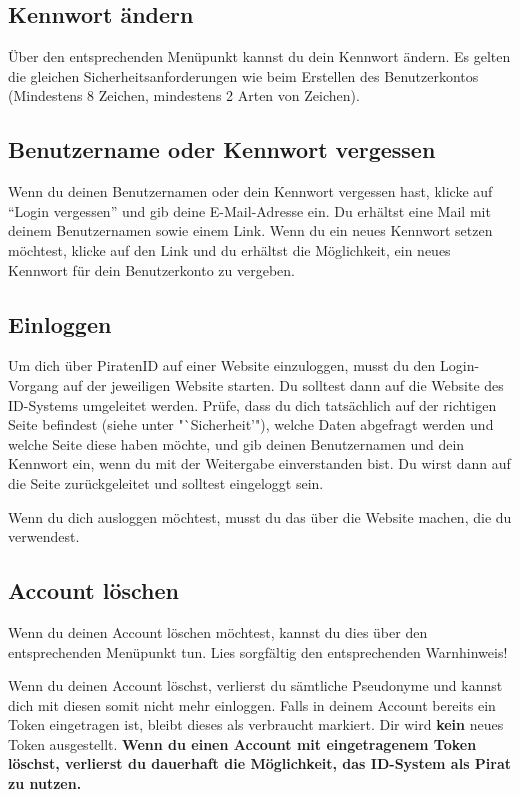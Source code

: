 \documentclass[parskip=half]{scrartcl}
\begin{document}
\subsection{Kennwort ändern}
Über den entsprechenden Menüpunkt kannst du dein Kennwort ändern.
Es gelten die gleichen Sicherheitsanforderungen wie beim Erstellen des Benutzerkontos (Mindestens 8 Zeichen, mindestens 2 Arten von Zeichen).

\subsection{Benutzername oder Kennwort vergessen}
Wenn du deinen Benutzernamen oder dein Kennwort vergessen hast, klicke auf "`Login vergessen"' und gib deine E-Mail-Adresse ein.
Du erhältst eine Mail mit deinem Benutzernamen sowie einem Link.
Wenn du ein neues Kennwort setzen möchtest, klicke auf den Link und du erhältst die Möglichkeit, ein neues Kennwort für dein Benutzerkonto zu vergeben.

\subsection{Einloggen}
Um dich über PiratenID auf einer Website einzuloggen, musst du den Login-Vorgang auf der jeweiligen Website starten.
Du solltest dann auf die Website des ID-Systems umgeleitet werden.
Prüfe, dass du dich tatsächlich auf der richtigen Seite befindest (siehe unter "`Sicherheit'"),
welche Daten abgefragt werden und welche Seite diese haben möchte,
und gib deinen Benutzernamen und dein Kennwort ein, wenn du mit der Weitergabe einverstanden bist.
Du wirst dann auf die Seite zurückgeleitet und solltest eingeloggt sein.

Wenn du dich ausloggen möchtest, musst du das über die Website machen, die du verwendest.

\subsection{Account löschen}
Wenn du deinen Account löschen möchtest, kannst du dies über den entsprechenden Menüpunkt tun.
Lies sorgfältig den entsprechenden Warnhinweis!

Wenn du deinen Account löschst, verlierst du sämtliche Pseudonyme und kannst dich mit diesen somit nicht mehr einloggen.
Falls in deinem Account bereits ein Token eingetragen ist, bleibt dieses als verbraucht markiert.
Dir wird \textbf{kein} neues Token ausgestellt.
\textbf{Wenn du einen Account mit eingetragenem Token löschst, verlierst du dauerhaft die Möglichkeit, das ID-System als Pirat zu nutzen.}
\end{document}
